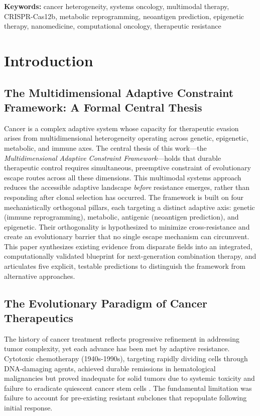 \documentclass[12pt,a4paper]{article}
\begin{document}
\noindent\textbf{Keywords:} cancer heterogeneity, systems oncology, multimodal therapy, CRISPR-Cas12b, metabolic reprogramming, neoantigen prediction, epigenetic therapy, nanomedicine, computational oncology, therapeutic resistance

\thispagestyle{empty}

\newpage
\pagestyle{mainstyle}
\setcounter{page}{1}

\section{Introduction}

\subsection{The Multidimensional Adaptive Constraint Framework: A Formal Central Thesis}

Cancer is a complex adaptive system whose capacity for therapeutic evasion arises from multidimensional heterogeneity operating across genetic, epigenetic, metabolic, and immune axes. The central thesis of this work—the \textit{Multidimensional Adaptive Constraint Framework}—holds that durable therapeutic control requires simultaneous, preemptive constraint of evolutionary escape routes across all these dimensions. This multimodal systems approach reduces the accessible adaptive landscape \textit{before} resistance emerges, rather than responding after clonal selection has occurred. The framework is built on four mechanistically orthogonal pillars, each targeting a distinct adaptive axis: genetic (immune reprogramming), metabolic, antigenic (neoantigen prediction), and epigenetic. Their orthogonality is hypothesized to minimize cross-resistance and create an evolutionary barrier that no single escape mechanism can circumvent. This paper synthesizes existing evidence from disparate fields into an integrated, computationally validated blueprint for next-generation combination therapy, and articulates five explicit, testable predictions to distinguish the framework from alternative approaches.

\subsection{The Evolutionary Paradigm of Cancer Therapeutics}

The history of cancer treatment reflects progressive refinement in addressing tumor complexity, yet each advance has been met by adaptive resistance. Cytotoxic chemotherapy (1940s-1990s), targeting rapidly dividing cells through DNA-damaging agents, achieved durable remissions in hematological malignancies but proved inadequate for solid tumors due to systemic toxicity and failure to eradicate quiescent cancer stem cells \citep{devita2008}. The fundamental limitation was failure to account for pre-existing resistant subclones that repopulate following initial response.
\end{document}
